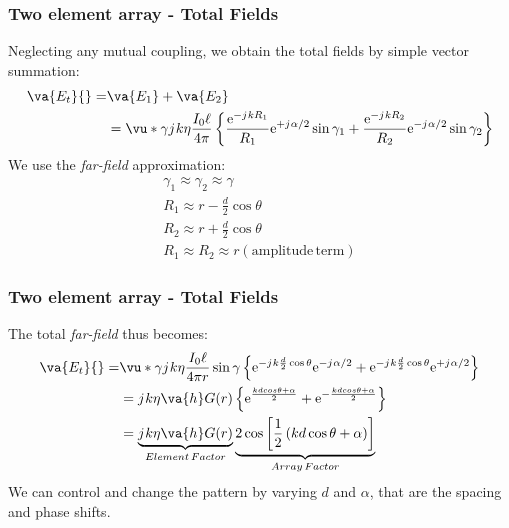 \documentclass[10pt]{beamer}
\newcommand{\e}{\mathrm{e}} %
\renewcommand{\j}{{j}\mkern1mu} %
\begin{document}
\begin{frame}
    \frametitle{Two element array - Total Fields}
Neglecting any mutual coupling, we obtain the total fields by simple vector summation:
\begin{align*}
    \va{E_t} {}=& \va{E_1} + \va{E_2} \\
    &= \vu*{\gamma} \j k \eta \frac{I_{0} \ell}{4 \pi}\left\{\frac{\e^{-\j k R_{1}}}{R_{1}} \e^{+\j \alpha / 2} \sin \gamma_{1}+\frac{\e^{-\j k R_{2}}}{R_{2}} \e^{-\j \alpha / 2} \sin \gamma_{2}\right\}
 \end{align*}
    We use the \textit{far-field} approximation:
    \begin{align*}
        \gamma_1 \approx \gamma_2 \approx \gamma \\
        R_1 \approx r - \frac{d}{2} \cos \theta \\
        R_2 \approx r + \frac{d}{2} \cos \theta \\
       R_1 \approx R_2 \approx r (\mathrm{amplitude \, term})
    \end{align*}
\end{frame}

\begin{frame}
    \frametitle{Two element array - Total Fields}

    The total \textit{far-field} thus becomes:
    \begin{align*}
        \va{E_t} {}=& \vu*{\gamma} \j k \eta \frac{I_{0} \ell}{4 \pi r} \sin \gamma \left\{\e^{-\j k \frac{d}{2}\cos \theta } \e^{- \j \alpha / 2} + \e^{-\j k \frac{d}{2}\cos \theta } \e^{+\j \alpha / 2}\right\} \\
        &= \j k \eta \va{h} G(r) \left\{ \e^{\frac{k d cos \theta + \alpha}{2}} + \e^{-\frac{k d cos \theta + \alpha}{2}}\right\} \\
        &= \underbrace{\j k \eta \va{h} G(r)}_{Element \, Factor} \underbrace{2 \cos \left[\frac{1}{2}\left(k d \cos \theta + \alpha\right)\right]}_{Array \, Factor}
    \end{align*}
We can control and change the pattern by varying $d$ and $\alpha$, that are the spacing and phase shifts.
\end{frame}
\end{document}
